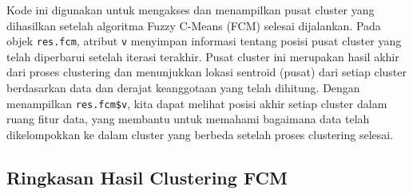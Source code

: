 \documentclass[
  oneside]{book}
\newenvironment{Shaded}{\begin{snugshade}}{\end{snugshade}}
\newcommand{\CommentTok}[1]{\textcolor[rgb]{0.56,0.35,0.01}{\textit{#1}}}
\newcommand{\NormalTok}[1]{#1}
\newcommand{\SpecialCharTok}[1]{\textcolor[rgb]{0.81,0.36,0.00}{\textbf{#1}}}
\begin{document}
\begin{Shaded}
\end{Shaded}

Kode ini digunakan untuk mengakses dan menampilkan pusat cluster yang dihasilkan setelah algoritma Fuzzy C-Means (FCM) selesai dijalankan. Pada objek \texttt{res.fcm}, atribut \texttt{v} menyimpan informasi tentang posisi pusat cluster yang telah diperbarui setelah iterasi terakhir. Pusat cluster ini merupakan hasil akhir dari proses clustering dan menunjukkan lokasi sentroid (pusat) dari setiap cluster berdasarkan data dan derajat keanggotaan yang telah dihitung. Dengan menampilkan \texttt{res.fcm\$v}, kita dapat melihat posisi akhir setiap cluster dalam ruang fitur data, yang membantu untuk memahami bagaimana data telah dikelompokkan ke dalam cluster yang berbeda setelah proses clustering selesai.

\begin{Shaded}
\end{Shaded}

\subsection*{Ringkasan Hasil Clustering FCM}\label{ringkasan-hasil-clustering-fcm}
\end{document}
